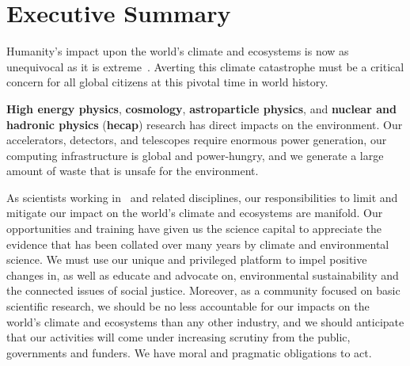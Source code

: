\documentclass[../SustainableHEP.tex]{subfiles}
\begin{document}
\RaggedRight
\sloppy
\newpage


\section*{Executive Summary}
\label{sec:Executive_Summary}

Humanity's impact upon the world's climate and ecosystems is now as unequivocal as it is extreme~\cite{IPCC2021reportSPM}. Averting this climate catastrophe 
must be a critical concern for all global citizens at this pivotal time in world history.

\textbf{High energy physics}, \textbf{cosmology}, \textbf{astroparticle physics}, and \textbf{nuclear and hadronic physics} (\textbf{\acrshort{hecap}}) research has direct impacts on the environment.  Our accelerators, detectors, and telescopes require enormous power generation, our computing infrastructure is global and power-hungry, and we generate a large amount of waste that is unsafe for the environment.

As scientists working in \ACR\ and related disciplines, our responsibilities to limit and mitigate our impact on the world's climate and ecosystems are manifold. Our opportunities and training have given us the science capital to appreciate the evidence that has been collated over many years by climate and environmental science. We must use our unique and privileged platform to impel positive changes in, as well as educate and advocate on, environmental sustainability and the connected issues of social justice. Moreover, as a community focused on basic scientific research, we should be no less accountable for our impacts on the world's climate and ecosystems than any other industry, and we should anticipate that our activities will come under increasing scrutiny from the public, governments and funders. We have moral and pragmatic obligations to act.
\end{document}
